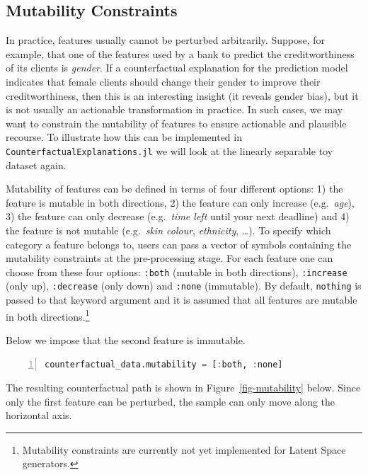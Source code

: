 \documentclass[
  letterpaper,
  DIV=11,
  numbers=noendperiod]{scrartcl}
\begin{document}
\hypertarget{mutability-constraints}{%
\subsection{Mutability Constraints}\label{mutability-constraints}}

In practice, features usually cannot be perturbed arbitrarily. Suppose,
for example, that one of the features used by a bank to predict the
creditworthiness of its clients is \emph{gender}. If a counterfactual
explanation for the prediction model indicates that female clients
should change their gender to improve their creditworthiness, then this
is an interesting insight (it reveals gender bias), but it is not
usually an actionable transformation in practice. In such cases, we may
want to constrain the mutability of features to ensure actionable and
plausible recourse. To illustrate how this can be implemented in
\texttt{CounterfactualExplanations.jl} we will look at the linearly
separable toy dataset again.

Mutability of features can be defined in terms of four different
options: 1) the feature is mutable in both directions, 2) the feature
can only increase (e.g.~\emph{age}), 3) the feature can only decrease
(e.g.~\emph{time left} until your next deadline) and 4) the feature is
not mutable (e.g.~\emph{skin colour}, \emph{ethnicity}, \ldots). To
specify which category a feature belongs to, users can pass a vector of
symbols containing the mutability constraints at the pre-processing
stage. For each feature one can choose from these four options:
\texttt{:both} (mutable in both directions), \texttt{:increase} (only
up), \texttt{:decrease} (only down) and \texttt{:none} (immutable). By
default, \texttt{nothing} is passed to that keyword argument and it is
assumed that all features are mutable in both directions.\footnote{Mutability
  constraints are currently not yet implemented for Latent Space
  generators.}

Below we impose that the second feature is immutable.

\begin{lstlisting}[language=Julia, escapechar=@, numbers=left, label={lst:mutability}, caption={Adding mutability constraints.}]
counterfactual_data.mutability = [:both, :none]
\end{lstlisting}

The resulting counterfactual path is shown in
Figure~\ref{fig-mutability} below. Since only the first feature can be
perturbed, the sample can only move along the horizontal axis.
\end{document}
